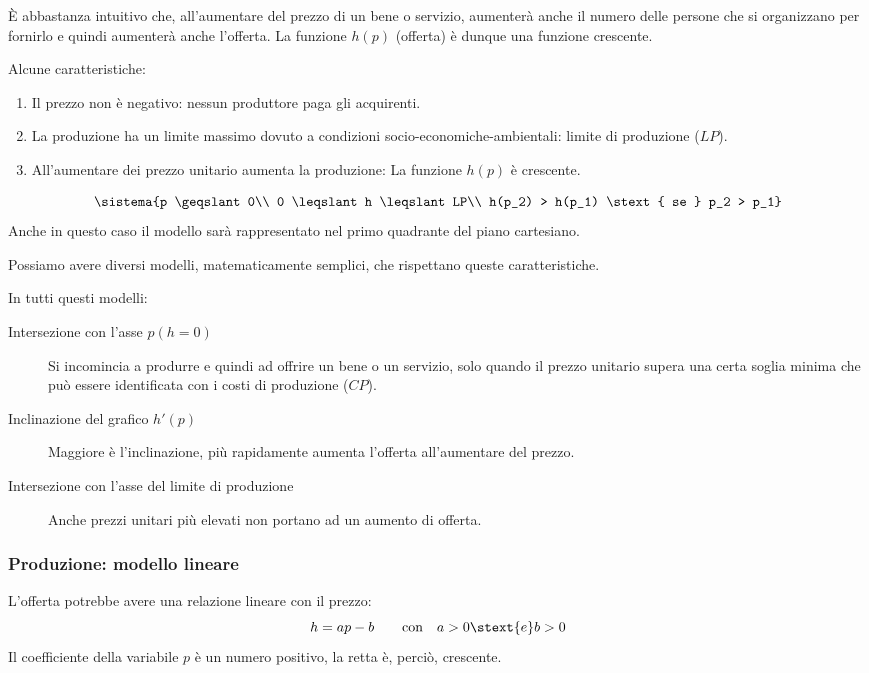 È abbastanza intuitivo che, all'aumentare del prezzo di un bene o servizio, 
aumenterà anche il numero delle persone che si organizzano per fornirlo e 
quindi aumenterà anche l'offerta.
La funzione \(h(p)\) (offerta) è dunque una funzione crescente.

Alcune caratteristiche:
\begin{enumerate} [nosep]
\item Il prezzo non è negativo: nessun produttore paga gli acquirenti. 
\item La produzione ha un limite massimo dovuto a condizioni 
socio-economiche-ambientali: limite di produzione (\(LP\)).
\item All'aumentare dei prezzo unitario aumenta la produzione:
La funzione \(h(p)\) è crescente.
\end{enumerate}
\[\sistema{p \geqslant 0\\ 0 \leqslant h \leqslant LP\\ 
h(p_2) > h(p_1) \stext{ se } p_2 > p_1}\]
Anche in questo caso il modello sarà rappresentato nel primo quadrante del 
piano cartesiano.

Possiamo avere diversi modelli, matematicamente semplici, che rispettano 
queste caratteristiche.

In tutti questi modelli:
\begin{description}
\item [Intersezione con l'asse \(p (h=0)\)]
Si incomincia a produrre e quindi ad offrire un bene o un servizio, solo 
quando il prezzo unitario supera una certa soglia minima che può essere 
identificata con i costi di produzione (\(CP\)).
\item  [Inclinazione del grafico \(h'(p)\)]
Maggiore è l'inclinazione, più rapidamente aumenta l'offerta 
all'aumentare del prezzo. 
\item  [Intersezione con l'asse del limite di produzione]
Anche prezzi unitari più elevati non portano ad un aumento di offerta.
\end{description}

\subsubsection{Produzione: modello lineare}

L'offerta potrebbe avere una relazione lineare con il prezzo:
\[h= ap-b \qquad \text{con} \quad a > 0 \stext{ e } b > 0\]
Il coefficiente della variabile \(p\) è un numero positivo, la retta è, 
perciò, crescente. 


